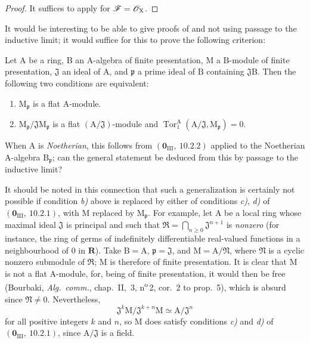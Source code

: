 \begin{proof}
It suffices to apply  for $\mathscr{F}=\mathscr{O}_\mathrm{X}$.
\end{proof}

\begin{remark}[11.3.12]
\label{IV.11.3.12}
It would be interesting to be able to give proofs of  and  not using passage to the inductive limit; it would suffice for this to prove the following criterion:

Let $\mathrm{A}$ be a ring, $\mathrm{B}$ an $\mathrm{A}$-algebra of finite presentation, $\mathrm{M}$ a $\mathrm{B}$-module of finite presentation, $\mathfrak{J}$ an  ideal of $\mathrm{A}$, and $\mathfrak{p}$ a prime ideal of $\mathrm{B}$ containing $\mathfrak{J}\mathrm{B}$. Then the following two conditions are equivalent:
\begin{enumerate}[label=\emph{\alph*)}]
  \item $\mathrm{M}_\mathfrak{p}$ is a flat $\mathrm{A}$-module.
  \item $\mathrm{M}_\mathfrak{p}/\mathfrak{J}\mathrm{M}_\mathfrak{p}$ is a flat $(\mathrm{A}/\mathfrak{J})$-module and $\operatorname{Tor}_1^\mathrm{A}(\mathrm{A}/\mathfrak{J},\mathrm{M}_\mathfrak{p})=0$.
\end{enumerate}
When $\mathrm{A}$ is \emph{Noetherian}, this follows from $(\mathbf{0}_{\mathrm{III}},~10.2.2)$ applied to the Noetherian $\mathrm{A}$-algebra $\mathrm{B}_\mathfrak{p}$; can the general statement be deduced from this by passage to the inductive limit?

It should be noted in this connection that such a generalization is certainly not possible if condition \emph{b)} above is replaced by either of conditions \emph{c)}, \emph{d)} of $(\mathbf{0}_{\mathrm{III}},~10.2.1)$, with $\mathrm{M}$ replaced by $\mathrm{M}_\mathfrak{p}$. For example, let $\mathrm{A}$ be a local ring whose maximal ideal $\mathfrak{J}$ is principal and such that $\mathfrak{R}=\bigcap_{n\geqslant 0}\mathfrak{J}^{n+1}$
is \emph{nonzero} (for instance, the ring of germs of indefinitely differentiable real-valued functions in a neighbourhood of $0$ in $\mathbf{R}$). Take $\mathrm{B}=\mathrm{A}$, $\mathfrak{p}=\mathfrak{J}$, and $\mathrm{M}=\mathrm{A}/\mathfrak{N}$, where $\mathfrak{N}$ is a cyclic nonzero submodule of $\mathfrak{R}$; $\mathrm{M}$ is therefore of finite presentation. It is clear that $\mathrm{M}$ is not a flat $\mathrm{A}$-module, for, being of finite presentation, it would then be free (Bourbaki, \emph{Alg.\ comm.}, chap.~II, \textsection\,3, n\textsuperscript{o}\,2, cor.~2 to prop.~5), which is absurd since $\mathfrak{N}\neq 0$. Nevertheless,
\[
  \mathfrak{J}^k\mathrm{M}/\mathfrak{J}^{k+n}\mathrm{M}\simeq \mathrm{A}/\mathfrak{J}^n
\]
for all positive integers $k$ and $n$, so $\mathrm{M}$ does satisfy conditions \emph{c)} and \emph{d)} of $(\mathbf{0}_{\mathrm{III}},~10.2.1)$, since $\mathrm{A}/\mathfrak{J}$ is a field.
\end{remark}

